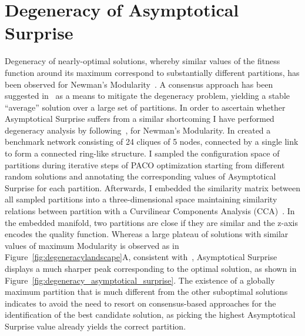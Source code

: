 \section{Degeneracy of Asymptotical Surprise}\label{sec:degeneracy_asymptotical_surprise}
Degeneracy of nearly-optimal solutions, whereby similar values of the fitness function around its maximum correspond to substantially different partitions, has been observed for Newman's Modularity~\cite{good2009}.
A consensus approach has been suggested in~\cite{lancichinetti2012} as a means to mitigate the degeneracy problem, yielding a stable ``average'' solution over a large set of partitions.
In order to ascertain whether Asymptotical Surprise suffers from a similar shortcoming I have performed degeneracy analysis by following~\cite{good2009}, for Newman's Modularity.
In created a benchmark network consisting of 24 cliques of 5 nodes, connected by a single link to form a connected ring-like structure.
I sampled the configuration space of partitions during iterative steps of PACO optimization starting from different random solutions and annotating the corresponding values of Asymptotical Surprise for each partition.
Afterwards, I embedded the similarity matrix between all sampled partitions into a three-dimensional space maintaining similarity relations between partition with a Curvilinear Components Analysis (CCA)~\cite{good2009}.
In the embedded manifold, two partitions are close if they are similar and the z-axis encodes the quality function.
Whereas a large plateau of solutions with similar values of maximum Modularity is observed as in Figure~\ref{fig:degeneracylandscape}A, consistent with~\cite{good2009}, Asymptotical Surprise displays a much sharper peak corresponding to the optimal solution, as shown in Figure~\ref{fig:degeneracy_asymptotical_surprise}.
The existence of a globally maximum partition that is much different from the other suboptimal solutions indicates to avoid the need to resort on consensus-based approaches for the identification of the best candidate solution, as picking the highest Asymptotical Surprise value already yields the correct partition.


